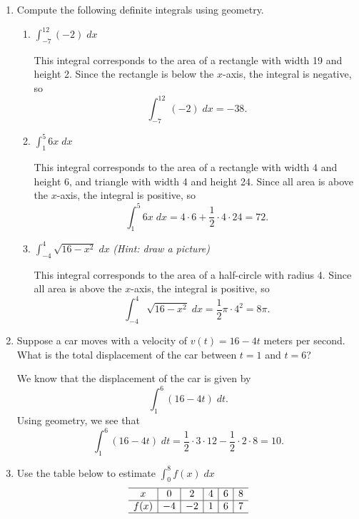 \documentclass[11pt]{article}
\newcommand{\ds}{\displaystyle}
\begin{document}
\drawtitle

\begin{enumerate}
\item Compute the following definite integrals using geometry.
  \begin{enumerate}
  \item $\ds\int_{-7}^{12} (-2)\;dx$
    \vfill
    {\color{blue}
      
      This integral corresponds to the area of a rectangle with width
      19 and height 2. Since the rectangle is below the $x$-axis, the
      integral is negative, so
      \[
      \int_{-7}^{12} (-2)\;dx = -38.
      \]

    }
     \vfill
  \item $\ds\int_1^5 6x \;dx$
    \vfill
    {\color{blue}
      
      This integral corresponds to the area of a rectangle with width
      4 and height 6, and triangle with width 4 and height 24. Since
      all area is above the $x$-axis, the integral is positive, so
      \[
      \int_{1}^{5} 6x\;dx = 4\cdot 6 + \frac{1}{2}\cdot 4\cdot 24 = 72.
      \]
     

    }
     \vfill
    \newpage
  \item $\ds\int_{-4}^4 \sqrt{16-x^2}\;dx$ \textit{(Hint: draw a picture)}
    \vfill
    {\color{blue}
      
      This integral corresponds to the area of a half-circle with
      radius 4. Since all area is above the $x$-axis, the integral is
      positive, so
      \[
      \int_{-4}^4 \sqrt{16-x^2}\;dx = \frac{1}{2}\pi\cdot 4^2 = 8\pi.
      \]
     

    }
     \vfill
  \end{enumerate}

\item Suppose a car moves with a velocity of $v(t) = 16 - 4t$ meters
  per second.  What is the total displacement of the car between $t =
  1$ and $t = 6$?
    \vfill
    {\color{blue}
      
      We know that the displacement of the car is given by
      \[
      \int_1^6 (16-4t)\; dt.
      \]
      Using geometry, we see that
      \[
      \int_1^6 (16-4t)\; dt = \frac{1}{2}\cdot 3\cdot 12 -
      \frac{1}{2}\cdot 2\cdot 8 = 10.
      \]
      
    }
   \vfill

  \newpage

\item Use the table below to estimate $\ds\int_0^{8} f(x)\;dx$
  \[
  \begin{array}{c|c|c|c|c|c}
    \hline
    x&0&2&4&6&8\\
    \hline
    f(x)&-4&-2&1&6&7\\
    \hline
  \end{array}
  \]
  \vfill
  {\color{blue}
    
}
\end{enumerate}
\end{document}
